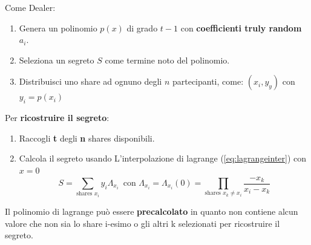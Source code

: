 \begin{theorem}\label{thm:tnsecret}
Come Dealer:
\begin{enumerate}
    \item Genera un polinomio $p(x)$ di grado $t-1$ con \textbf{coefficienti truly random} $a_i$.
    \item Seleziona un segreto $S$ come termine noto del polinomio.
    \item Distribuisci uno share ad ognuno degli $n$ partecipanti, come: 
    $(x_i,y_y)$ con $ y_i=p(x_i)$
\end{enumerate}
Per \textbf{ricostruire il segreto}:
\begin{enumerate}
    \item Raccogli \textbf{t} degli \textbf{n} shares disponibili.
    \item Calcola il segreto usando L'interpolazione di lagrange (\cref{eq:lagrangeinter}) con $x=0$
    \begin{equation}\label{eq:tnsecret}
        S=\sum_{\text{shares }x_i}y_i\Lambda_{x_i}\,\,\,\text{con}\,\,\Lambda_{x_i}=\Lambda_{x_i}(0)=\prod_{\text{shares }x_k\ne x_i}\frac{-x_k}{x_i-x_k}
    \end{equation}
\end{enumerate}
\end{theorem}
\begin{remark}
Il polinomio di lagrange può essere \textbf{precalcolato} in quanto non contiene alcun valore che non sia lo share i-esimo o gli altri k selezionati per ricostruire il segreto.
\end{remark}
